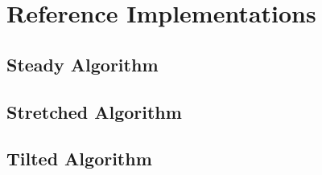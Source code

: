 \section{Reference Implementations}

\subsection{Steady Algorithm}





\subsection{Stretched Algorithm}





\subsection{Tilted Algorithm}




